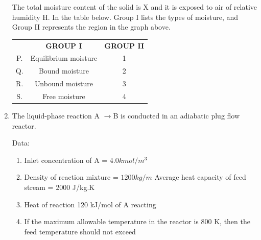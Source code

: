 \documentclass[journal,12pt,onecolumn]{IEEEtran}
\theoremstyle{remark}
\begin{document}
\begin{enumerate}
		
		The total moisture content of the solid is X and it is exposed to air of relative humidity H. In the table below. Group I lists the types of moisture, and Group II represents the region in the graph above. 
		\begin{center}
			\begin{tabular}{ c c c }
				& \textbf{GROUP I} &\textbf{GROUP II} \\
				P. & Equilibrium moisture & 1 \\
				Q. & Bound moisture & 2 \\ 
				R. & Unbound moisture & 3 \\
				S. & Free moisture & 4 
			\end{tabular}
		\end{center}
		\begin{enumerate}
		\end{enumerate} 
		
		\hfill \brak{\text{GATE CH 2009}}
		
		
		\item The liquid-phase reaction A $\rightarrow$B is conducted in an adiabatic plug flow reactor.
		
		Data:
		\begin{enumerate}
			\item Inlet concentration of A = $4.0 kmol/m^3$
			\item Density of reaction mixture  = $1200 kg/m$ Average heat capacity of feed stream  = 2000 J/kg.K
			\item Heat of reaction 120 kJ/mol of A reacting
			\item If the maximum allowable temperature in the reactor is 800 K, then the feed temperature  should not exceed
		\end{enumerate} 
		\begin{enumerate}
		\end{enumerate} 
		

\end{enumerate}
\end{document}
